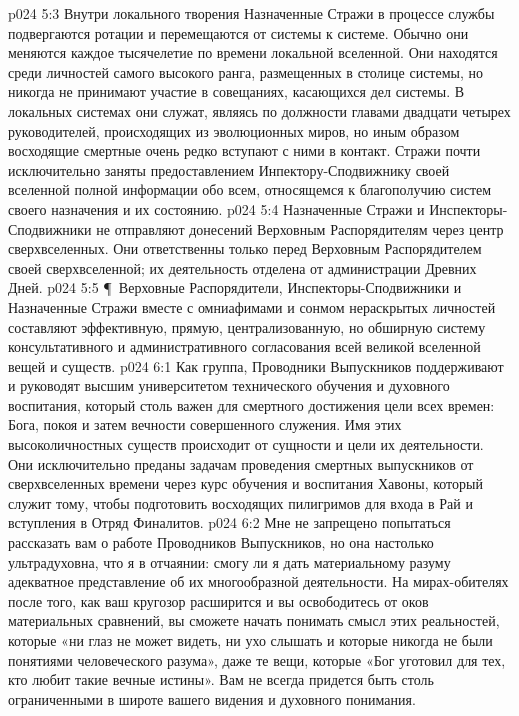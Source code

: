 \vs p024 5:3 Внутри локального творения Назначенные Стражи в процессе службы подвергаются ротации и перемещаются от системы к системе. Обычно они меняются каждое тысячелетие по времени локальной вселенной. Они находятся среди личностей самого высокого ранга, размещенных в столице системы, но никогда не принимают участие в совещаниях, касающихся дел системы. В локальных системах они служат, являясь по должности главами двадцати четырех руководителей, происходящих из эволюционных миров, но иным образом восходящие смертные очень редко вступают с ними в контакт. Стражи почти исключительно заняты предоставлением Инпектору\hyp{}Сподвижнику своей вселенной полной информации обо всем, относящемся к благополучию систем своего назначения и их состоянию.
\vs p024 5:4 Назначенные Стражи и Инспекторы\hyp{}Сподвижники не отправляют донесений Верховным Распорядителям через центр сверхвселенных. Они ответственны только перед Верховным Распорядителем своей сверхвселенной; их деятельность отделена от администрации Древних Дней.
\vs p024 5:5 \P\ Верховные Распорядители, Инспекторы\hyp{}Сподвижники и Назначенные Стражи вместе с омниафимами и сонмом нераскрытых личностей составляют эффективную, прямую, централизованную, но обширную систему консультативного и административного согласования всей великой вселенной вещей и существ.
\vs p024 6:1 Как группа, Проводники Выпускников поддерживают и руководят высшим университетом технического обучения и духовного воспитания, который столь важен для смертного достижения цели всех времен: Бога, покоя и затем вечности совершенного служения. Имя этих высоколичностных существ происходит от сущности и цели их деятельности. Они исключительно преданы задачам проведения смертных выпускников от сверхвселенных времени через курс обучения и воспитания Хавоны, который служит тому, чтобы подготовить восходящих пилигримов для входа в Рай и вступления в Отряд Финалитов.
\vs p024 6:2 Мне не запрещено попытаться рассказать вам о работе Проводников Выпускников, но она настолько ультрадуховна, что я в отчаянии: смогу ли я дать материальному разуму адекватное представление об их многообразной деятельности. На мирах\hyp{}обителях после того, как ваш кругозор расширится и вы освободитесь от оков материальных сравнений, вы сможете начать понимать смысл этих реальностей, которые «ни глаз не может видеть, ни ухо слышать и которые никогда не были понятиями человеческого разума», даже те вещи, которые «Бог уготовил для тех, кто любит такие вечные истины». Вам не всегда придется быть столь ограниченными в широте вашего видения и духовного понимания.
